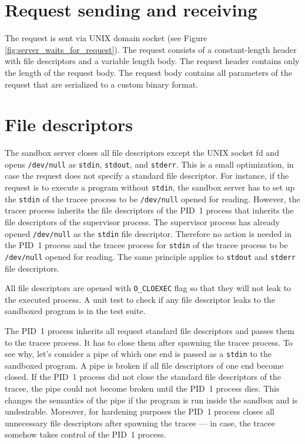 \documentclass[en]{pracamgr}
\begin{document}
\section{Request sending and receiving}

The request is sent via UNIX domain socket (see Figure \ref{fig:server_waits_for_request}). The request consists of a constant-length header with file descriptors and a variable length body. The request header contains only the length of the request body. The request body contains all parameters of the request that are serialized to a custom binary format.

\section{File descriptors}

The sandbox server closes all file descriptors except the UNIX socket fd and opens \texttt{/dev/null} as \texttt{stdin}, \texttt{stdout}, and \texttt{stderr}. This is a small optimization, in case the request does not specify a standard file descriptor. For instance, if the request is to execute a program without \texttt{stdin}, the sandbox server has to set up the \texttt{stdin} of the tracee process to be \texttt{/dev/null} opened for reading. However, the tracee process inherits the file descriptors of the PID~1 process that inherits the file descriptors of the supervisor process. The supervisor process has already opened \texttt{/dev/null} as the \texttt{stdin} file descriptor. Therefore no action is needed in the PID~1 process and the tracee process for \texttt{stdin} of the tracee process to be \texttt{/dev/null} opened for reading. The same principle applies to \texttt{stdout} and \texttt{stderr} file descriptors.

All file descriptors are opened with \texttt{O\_CLOEXEC} flag so that they will not leak to the executed process. A unit test to check if any file descriptor leaks to the sandboxed program is in the test suite.

The PID~1 process inherits all request standard file descriptors and passes them to the tracee process. It has to close them after spawning the tracee process. To see why, let's consider a pipe of which one end is passed as a \texttt{stdin} to the sandboxed program. A pipe is broken if all file descriptors of one end become closed. If the PID~1 process did not close the standard file descriptors of the tracee, the pipe could not become broken until the PID~1 process dies. This changes the semantics of the pipe if the program is run inside the sandbox and is undesirable. Moreover, for hardening purposes the PID~1 process closes all unnecessary file descriptors after spawning the tracee --- in case, the tracee somehow takes control of the PID~1 process.
\end{document}
